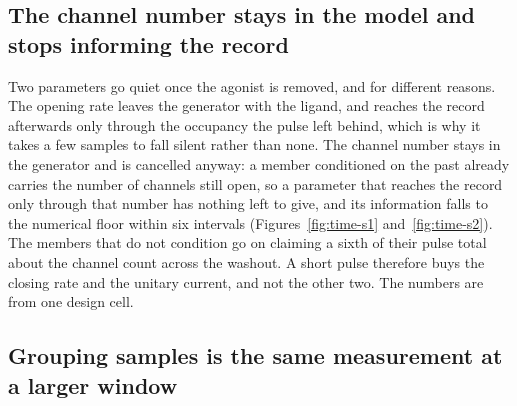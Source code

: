 \subsection*{The channel number stays in the model and stops informing the record}

Two parameters go quiet once the agonist is removed, and for different reasons. The opening rate leaves the generator with the ligand, and reaches the record afterwards only through the occupancy the pulse left behind, which is why it takes a few samples to fall silent rather than none. The channel number stays in the generator and is cancelled anyway: a member conditioned on the past already carries the number of channels still open, so a parameter that reaches the record only through that number has nothing left to give, and its information falls to the numerical floor within six intervals (Figures~\ref{fig:time-s1} and~\ref{fig:time-s2}). The members that do not condition go on claiming a sixth of their pulse total about the channel count across the washout. A short pulse therefore buys the closing rate and the unitary current, and not the other two. The numbers are from one design cell.

\subsection*{Grouping samples is the same measurement at a larger window}

